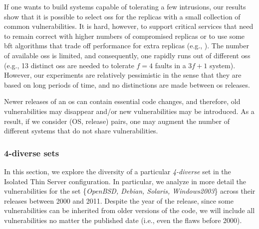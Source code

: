 If one wants to build systems capable of tolerating a few intrusions, our results show that it is possible to select \glspl{os} for the replicas with a small collection of common vulnerabilities. 
It is hard, however, to support critical services that need to remain correct with higher numbers of compromised replicas or to use some \gls{bft} algorithms that trade off performance for extra replicas (e.g., \cite{Abd-El-Malek:2005,Kotla:2010,Serafini:2010}). 
The number of available \glspl{os} is limited, and consequently, one rapidly runs out of different \glspl{os} (e.g., 13 distinct \glspl{os} are needed to tolerate $f=4$ faults in a $3f+1$ system). 
However, our experiments are relatively pessimistic in the sense that they are based on long periods of time, and no distinctions are made between \gls{os} releases.

Newer releases of an \gls{os} can contain essential code changes, and therefore, old vulnerabilities may disappear and/or new vulnerabilities may be introduced. 
As a result, if we consider (OS, release) pairs, one may augment the number of different systems that do not share vulnerabilities. 




\subsubsection*{4-diverse sets}
In this section, we explore the diversity of a particular \emph{4-diverse} set in the Isolated Thin Server configuration.
In particular, we analyze in more detail the vulnerabilities for the set \{\emph{OpenBSD, Debian, Solaris, Windows2003}\} across their releases between 2000 and 2011. 
Despite the year of the release, since some vulnerabilities can be inherited from older versions of the code, we will include all vulnerabilities no matter the published date (i.e., even the flaws before 2000).

